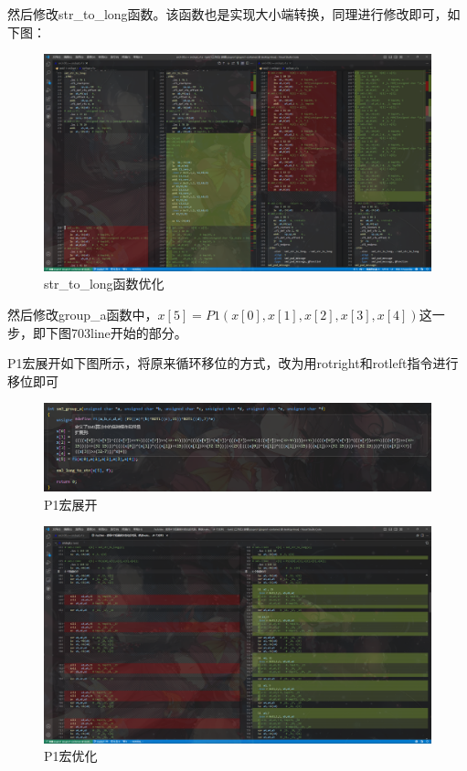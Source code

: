\documentclass[12pt,hyperref,a4paper,UTF8]{ctexart}
\begin{document}
  然后修改str\_to\_long函数。该函数也是实现大小端转换，同理进行修改即可，如下图：
  \begin{figure}[H]
      \centering
      \includegraphics[width =1.0\textwidth]{figures/fig/image12.png}
      \caption{str\_to\_long函数优化}
  \end{figure}

    然后修改group\_a函数中，$x[5] = P1(x[0],x[1],x[2],x[3],x[4])$这一步，即下图703line开始的部分。

    P1宏展开如下图所示，将原来循环移位的方式，改为用rotright和rotleft指令进行移位即可
    \begin{figure}[H]
      \centering
      \includegraphics[width =1.0\textwidth]{figures/fig/image14.png}
      \caption{P1宏展开}
  \end{figure}

  \begin{figure}[H]
      \centering
      \includegraphics[width =1.0\textwidth]{figures/fig/image13.png}
      \caption{P1宏优化}
  \end{figure}
\end{document}

